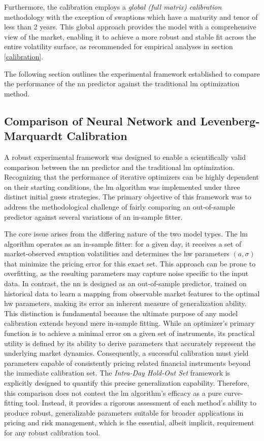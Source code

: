 Furthermore, the calibration employs a \textit{global (full matrix) calibration} methodology with the exception of swaptions which have a maturity and tenor of less than 2 years. This global approach provides the model with a comprehensive view of the market, enabling it to achieve a more robust and stable fit across the entire volatility surface, as recommended for empirical analyses in section \ref{calibration}.

The following section outlines the experimental framework established to compare the performance of the \ac{nn} predictor against the traditional \ac{lm} optimization method.

\subsection{Comparison of Neural Network and Levenberg-Marquardt Calibration}
\label{subsec:comparison_of_nn_and_lm}
A robust experimental framework was designed to enable a scientifically valid comparison between the \ac{nn} predictor and the traditional \ac{lm} optimization. Recognizing that the performance of iterative optimizers can be highly dependent on their starting conditions, the \ac{lm} algorithm was implemented under three distinct initial guess strategies. The primary objective of this framework was to address the methodological challenge of fairly comparing an out-of-sample predictor against several variations of an in-sample fitter.

The core issue arises from the differing nature of the two model types. The \ac{lm} algorithm operates as an in-sample fitter: for a given day, it receives a set of market-observed swaption volatilities and determines the \ac{hw} parameters $(a, \sigma)$ that minimize the pricing error for this exact set. This approach can be prone to overfitting, as the resulting parameters may capture noise specific to the input data. In contrast, the \ac{nn} is designed as an out-of-sample predictor, trained on historical data to learn a mapping from observable market features to the optimal \ac{hw} parameters, making its error an inherent measure of generalization ability. This distinction is fundamental because the ultimate purpose of any model calibration extends beyond mere in-sample fitting. While an optimizer's primary function is to achieve a minimal error on a given set of instruments, its practical utility is defined by its ability to derive parameters that accurately represent the underlying market dynamics. Consequently, a successful calibration must yield parameters capable of consistently pricing related financial instruments beyond the immediate calibration set. The \textit{Intra-Day Hold-Out Set} framework is explicitly designed to quantify this precise generalization capability. Therefore, this comparison does not contest the \ac{lm} algorithm's efficacy as a pure curve-fitting tool. Instead, it provides a rigorous assessment of each method's ability to produce robust, generalizable parameters suitable for broader applications in pricing and risk management, which is the essential, albeit implicit, requirement for any robust calibration tool.

